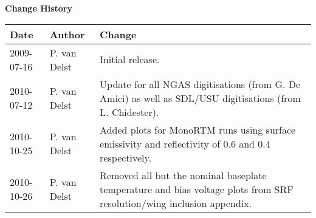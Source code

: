 \thispagestyle{empty}
\vspace*{10cm}
\begin{center}
  {\sffamily\Large\bfseries Change History}
  \begin{table}[htp]
    \centering
    \begin{tabular}{|p{2cm}|p{3cm}|p{8cm}|}
      \hline
      \sffamily\textbf{Date} & \sffamily\textbf{Author} & \sffamily\textbf{Change}\\
      \hline\hline
      2009-07-16 & P. van Delst & Initial release.\\
      \hline
      2010-07-12 & P. van Delst & Update for all NGAS digitisations (from G. De Amici) as well as SDL/USU digitisations (from L. Chidester).\\
      \hline
      2010-10-25 & P. van Delst & Added plots for MonoRTM runs using surface emissivity and reflectivity of 0.6 and 0.4 respectively.\\
      \hline
      2010-10-26 & P. van Delst & Removed all but the nominal baseplate temperature and bias voltage plots from SRF resolution/wing inclusion appendix.\\
      \hline
    \end{tabular}
  \end{table}
\end{center}
\clearpage
\pagestyle{fancy}
\fancyhead[LE,RO]{\sffamily \rightmark}
\fancyhead[LO,RE]{\sffamily \leftmark}
\setcounter{page}{1}








\clearpage




\begin{appendix}
  
  
  
  
\end{appendix}



